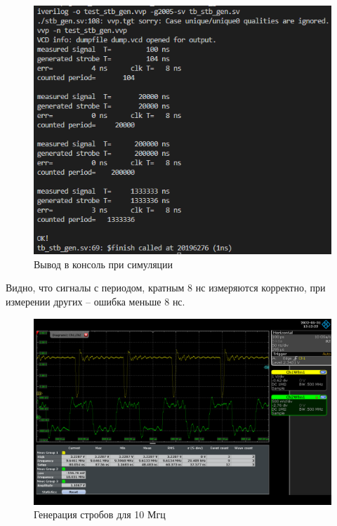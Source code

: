 \begin{figure}[ht!] 
	\center
	\includegraphics  [scale=0.8] {my_folder/images//tb_stb_gen_out}
	\caption{Вывод в консоль при симуляции} 
	\label{fig:tb-stb-gen-out}  
\end{figure}
\FloatBarrier

Видно, что сигналы с периодом, кратным 8 нс измеряются корректно, при измерении других -- ошибка меньше 8 нс.

\begin{figure}[ht!] 
	\center
	\includegraphics  [scale=0.3] {my_folder/images//stb_10mhz}
	\caption{Генерация стробов для 10 Мгц} 
	\label{fig:stb-10mhz}  
\end{figure}

